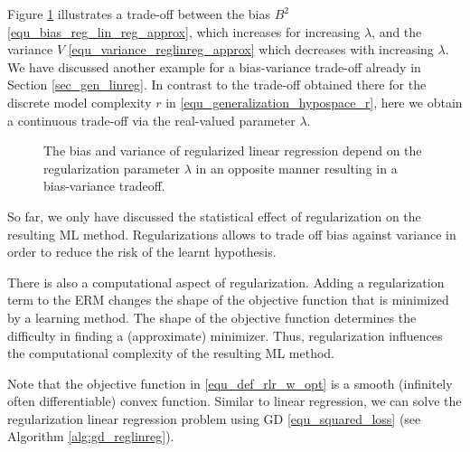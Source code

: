 \documentclass[12pt]{report}
\begin{document}
Figure \ref{fig_bias_variance_lambda} illustrates a trade-off between the bias $B^{2}$ 
\eqref{equ_bias_reg_lin_reg_approx}, which increases for increasing $\lambda$, 
and the variance $V$ \eqref{equ_variance_reglinreg_approx} which decreases with increasing $\lambda$.
We have discussed another example for a bias-variance trade-off already in Section \ref{sec_gen_linreg}. 
In contrast to the trade-off obtained there for the discrete model complexity $r$ in \eqref{equ_generalization_hypospace_r}, 
here we obtain a continuous trade-off via the real-valued parameter $\lambda$. 


\begin{figure}
\begin{center}
\end{center}
\caption{The bias and variance of regularized linear regression depend on the regularization parameter 
$\lambda$ in an opposite manner resulting in a bias-variance tradeoff.}
\label{fig_bias_variance_lambda}
\end{figure}


So far, we only have discussed the statistical effect of regularization on the 
resulting ML method. Regularizations allows to trade off bias against variance 
in order to reduce the risk of the learnt hypothesis. 

There is also a computational aspect of regularization. Adding a regularization 
term to the ERM changes the shape of the objective function that is minimized 
by a learning method. The shape of the objective function determines the difficulty 
in finding a (approximate) minimizer. Thus, regularization influences the computational
complexity of the resulting ML method.  

Note that the objective function in \eqref{equ_def_rlr_w_opt} is a smooth (infinitely often differentiable) 
convex function. Similar to linear regression, we can solve the regularization 
linear regression problem using GD \eqref{equ_squared_loss} 
(see Algorithm \ref{alg:gd_reglinreg}). 
\end{document}
